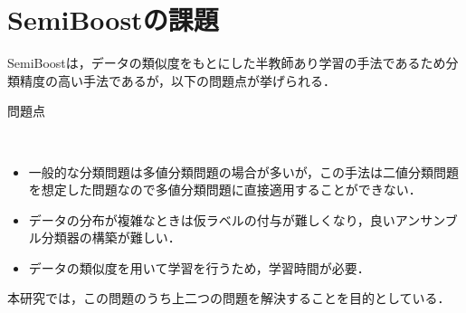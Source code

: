 \newpage
\section{SemiBoostの課題}
\label{sec:SemiBoost_prob}
SemiBoostは，データの類似度をもとにした半教師あり学習の手法であるため分類精度の高い手法であるが，以下の問題点が挙げられる．\par
\vspace{3.0mm}
\begin{description}
\item[問題点]\mbox{}\\
\end{description}
\vspace{-10.0mm}

\begin{itemize}
\item 一般的な分類問題は多値分類問題の場合が多いが，この手法は二値分類問題を想定した問題なので多値分類問題に直接適用することができない．\par
\item データの分布が複雑なときは仮ラベルの付与が難しくなり，良いアンサンブル分類器の構築が難しい．\par
\item データの類似度を用いて学習を行うため，学習時間が必要．

\end{itemize}

本研究では，この問題のうち上二つの問題を解決することを目的としている．









